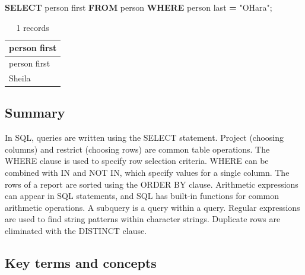 \documentclass[
]{article}
\newenvironment{Shaded}{\begin{snugshade}}{\end{snugshade}}
\newcommand{\KeywordTok}[1]{\textcolor[rgb]{0.13,0.29,0.53}{\textbf{#1}}}
\newcommand{\NormalTok}[1]{#1}
\newcommand{\OperatorTok}[1]{\textcolor[rgb]{0.81,0.36,0.00}{\textbf{#1}}}
\newcommand{\OtherTok}[1]{\textcolor[rgb]{0.56,0.35,0.01}{#1}}
\begin{document}
\begin{Shaded}
\begin{Highlighting}[]
\KeywordTok{SELECT}\NormalTok{ \textasciigrave{}person first\textasciigrave{} }\KeywordTok{FROM}\NormalTok{ person }\KeywordTok{WHERE}\NormalTok{ \textasciigrave{}person last\textasciigrave{} }\OperatorTok{=} \OtherTok{"O\textquotesingle{}Hara"}\NormalTok{;}
\end{Highlighting}
\end{Shaded}

\begin{longtable}[]{@{}l@{}}
\caption{1 records}\tabularnewline
\toprule()
person first \\
\midrule()
\endfirsthead
\toprule()
person first \\
\midrule()
\endhead
Sheila \\
\bottomrule()
\end{longtable}

\hypertarget{summary}{%
\subsection*{Summary}\label{summary}}

In SQL, queries are written using the SELECT statement. Project
(choosing columns) and restrict (choosing rows) are common table
operations. The WHERE clause is used to specify row selection criteria.
WHERE can be combined with IN and NOT IN, which specify values for a
single column. The rows of a report are sorted using the ORDER BY
clause. Arithmetic expressions can appear in SQL statements, and SQL has
built-in functions for common arithmetic operations. A subquery is a
query within a query. Regular expressions are used to find string
patterns within character strings. Duplicate rows are eliminated with
the DISTINCT clause.

\hypertarget{key-terms-and-concepts}{%
\subsection*{Key terms and concepts}\label{key-terms-and-concepts}}
\end{document}
